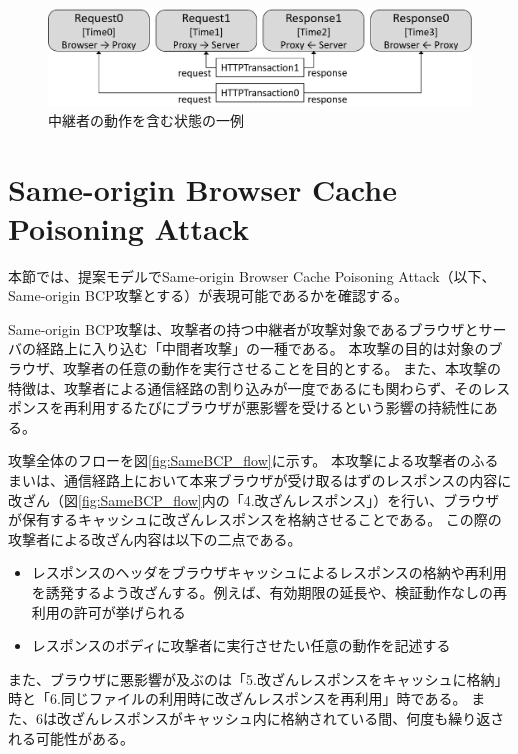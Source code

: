 \documentclass[12pt,a4paper]{jbook}
\begin{document}
\begin{figure}[htb]
\centering
\includegraphics[width=450pt]{./fig/TestIntermediary.eps}
\caption{中継者の動作を含む状態の一例}
\label{fig:TestIntermediary}
\end{figure}

\section{Same-origin Browser Cache Poisoning Attack}
\label{sec:same-origin-bcp}
本節では、提案モデルでSame-origin Browser Cache Poisoning Attack\cite{bcpattack}（以下、Same-origin BCP攻撃とする）が表現可能であるかを確認する。

Same-origin BCP攻撃は、攻撃者の持つ中継者が攻撃対象であるブラウザとサーバの経路上に入り込む「中間者攻撃」の一種である。
本攻撃の目的は対象のブラウザ、攻撃者の任意の動作を実行させることを目的とする。
また、本攻撃の特徴は、攻撃者による通信経路の割り込みが一度であるにも関わらず、そのレスポンスを再利用するたびにブラウザが悪影響を受けるという影響の持続性にある。

攻撃全体のフローを図\ref{fig:SameBCP_flow}に示す。
本攻撃による攻撃者のふるまいは、通信経路上において本来ブラウザが受け取るはずのレスポンスの内容に改ざん（図\ref{fig:SameBCP_flow}内の「4.改ざんレスポンス」）を行い、ブラウザが保有するキャッシュに改ざんレスポンスを格納させることである。
この際の攻撃者による改ざん内容は以下の二点である。
\begin{itemize}
\item レスポンスのヘッダをブラウザキャッシュによるレスポンスの格納や再利用を誘発するよう改ざんする。例えば、有効期限の延長や、検証動作なしの再利用の許可が挙げられる
\item レスポンスのボディに攻撃者に実行させたい任意の動作を記述する
\end{itemize}
また、ブラウザに悪影響が及ぶのは「5.改ざんレスポンスをキャッシュに格納」時と「6.同じファイルの利用時に改ざんレスポンスを再利用」時である。
また、6は改ざんレスポンスがキャッシュ内に格納されている間、何度も繰り返される可能性がある。
\end{document}
